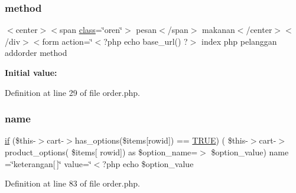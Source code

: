 \subsubsection{\texorpdfstring{method}{method}}
{\footnotesize\ttfamily $<$center$>$$<$span \mbox{\hyperlink{waiter_2olaporan_8php_a185c73c6507391d1eb38c776b68ce96d}{class}}=\char`\"{}oren\char`\"{}$>$ pesan$<$/span$>$ makanan$<$/center$>$$<$/div$>$$<$form action=\char`\"{}$<$?php echo base\+\_\+url() ?$>$ index php pelanggan addorder method}

{\bfseries Initial value\+:}
\begin{DoxyCode}{0}
\DoxyCodeLine{=\textcolor{stringliteral}{"post"}>}

\end{DoxyCode}


Definition at line 29 of file order.\+php.

\mbox{\label{pelanggan_2order_8php_afb270cde4944e425a37cf277116a7f43}} 
\subsubsection{\texorpdfstring{name}{name}}
{\footnotesize\ttfamily \mbox{\hyperlink{_code_igniter_8php_a68ca62d45495d195f67d234bdafb1d1f}{if}} (\$this-\/$>$cart-\/$>$has\+\_\+options(\$items\mbox{[}\textquotesingle{}rowid\textquotesingle{}\mbox{]}) == \mbox{\hyperlink{constants_8php_ae04a3efe6aa42044f803ee90c2277846}{T\+R\+UE}}) ( \$this-\/$>$cart-\/$>$product\+\_\+options( \$items\mbox{[} \textquotesingle{}rowid\textquotesingle{}\mbox{]}) as \$option\+\_\+name=$>$ \$option\+\_\+value) name =\char`\"{}keterangan\mbox{[}$\,$\mbox{]}\char`\"{} value=\char`\"{}$<$?php echo \$option\+\_\+value}



Definition at line 83 of file order.\+php.

